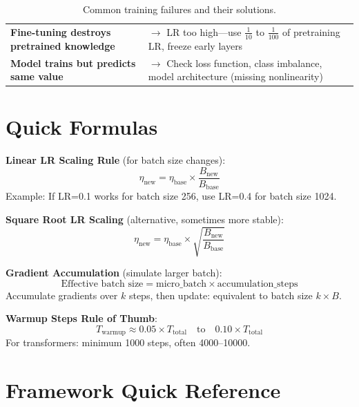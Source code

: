 \documentclass[../main.tex]{subfiles}
\begin{document}
\begin{table}[htbp]
\begin{tabularx}{\textwidth}{@{}>{\bfseries}lX@{}}
Fine-tuning destroys pretrained knowledge &
$\rightarrow$ LR too high---use $\frac{1}{10}$ to $\frac{1}{100}$ of pretraining LR, freeze early layers \\

Model trains but predicts same value &
$\rightarrow$ Check loss function, class imbalance, model architecture (missing nonlinearity) \\

\bottomrule
\end{tabularx}
\caption{Common training failures and their solutions.}
\label{tab:failure-modes}
\end{table}

\section{Quick Formulas}\label{sec:cheat-formulas}

\begin{tcolorbox}[colback=gray!5, colframe=gray!50]
\textbf{Linear LR Scaling Rule} (for batch size changes):
\[
\eta_{\text{new}} = \eta_{\text{base}} \times \frac{B_{\text{new}}}{B_{\text{base}}}
\]
Example: If LR=0.1 works for batch size 256, use LR=0.4 for batch size 1024.

\vspace{0.3cm}

\textbf{Square Root LR Scaling} (alternative, sometimes more stable):
\[
\eta_{\text{new}} = \eta_{\text{base}} \times \sqrt{\frac{B_{\text{new}}}{B_{\text{base}}}}
\]

\vspace{0.3cm}

\textbf{Gradient Accumulation} (simulate larger batch):
\[
\text{Effective batch size} = \text{micro\_batch} \times \text{accumulation\_steps}
\]
Accumulate gradients over $k$ steps, then update: equivalent to batch size $k \times B$.

\vspace{0.3cm}

\textbf{Warmup Steps Rule of Thumb}:
\[
T_{\text{warmup}} \approx 0.05 \times T_{\text{total}} \quad \text{to} \quad 0.10 \times T_{\text{total}}
\]
For transformers: minimum 1000 steps, often 4000--10000.
\end{tcolorbox}

\section{Framework Quick Reference}\label{sec:cheat-code}
\end{document}
